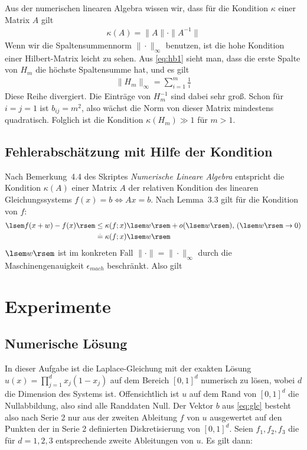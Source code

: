\documentclass[smallheadings]{scrartcl}
\numberwithin{equation}{section}
\begin{document}
Aus der numerischen linearen Algebra wissen wir, dass für die Kondition $\kappa$ einer Matrix $A$ gilt
\begin{align}
	\kappa(A)=\|A\|\cdot \|A^{-1}\|
	\label{eq:kond}
\end{align}
Wenn wir die Spaltensummennorm $\|\cdot \|_{\infty}$ benutzen, ist die hohe Kondition einer Hilbert-Matrix leicht zu sehen. Aus \ref{eq:hb1}  sieht man, dass die erste Spalte von $H_m$ die höchste Spaltensumme hat, und es gilt
\begin{align}
	\|H_m\|_{\infty}=\sum_{i=1}^{m}\frac{1}{i}
\end{align}
Diese Reihe divergiert. Die Einträge von $H_m^{-1}$ sind dabei sehr groß. Schon für $i=j=1$ ist $b_{ij} = m^2$, also wächst die Norm von dieser Matrix mindestens quadratisch. Folglich ist die Kondition $\kappa(H_m)\gg1$ für $m>1$.

\subsection{Fehlerabschätzung mit Hilfe der Kondition}

Nach Bemerkung~4.4 des Skriptes \textit{Numerische Lineare Algebra} entspricht die Kondition $\kappa(A)$ einer Matrix $A$ der relativen Kondition des linearen Gleichungssystems $f(x)=b \iff Ax=b$. Nach Lemma~3.3 gilt für die Kondition von $f$:
\begin{align}
\lsem f(x+w)-f(x)\rsem &\leq \kappa(f;x)\lsem w\rsem + o(\lsem w \rsem)\text{,   } (\lsem w \rsem \rightarrow 0)\\
&\stackrel{.}{=} \kappa(f;x)\lsem w\rsem
\end{align}
$\lsem w \rsem$ ist im konkreten Fall $\|\cdot\|=\|\cdot\|_\infty$ durch die Maschinengenauigkeit $\epsilon_{mach}$ beschränkt. Also gilt %

\section{Experimente}

\subsection{Numerische Lösung}

In dieser Aufgabe ist die Laplace-Gleichung mit der exakten Lösung $u(x)=\prod_{j=1}^{d}x_j(1-x_j)$ auf dem Bereich $[0, 1]^d$ numerisch zu lösen, wobei $d$ die Dimension des Systems ist. Offensichtlich ist $u$ auf dem Rand von $[0, 1]^d$ die Nullabbildung, also sind alle Randdaten Null. Der Vektor $b$ aus \ref{eq:glc} besteht also nach Serie 2 nur aus der zweiten Ableitung $f$ von $u$ ausgewertet auf den Punkten der in Serie 2 definierten Diskretisierung von $[0, 1]^d$. Seien $f_1, f_2, f_3$ die für $d=1, 2, 3$ entsprechende zweite Ableitungen von $u$. Es gilt dann:
\end{document}
